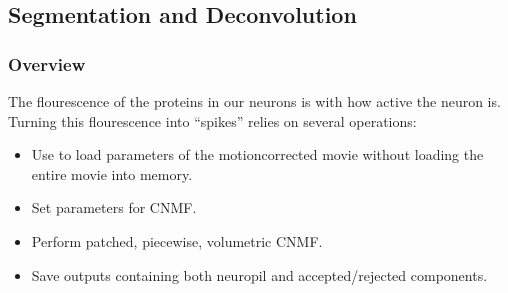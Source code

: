 \documentclass[letterpaper,10pt,english]{sphinxmanual}
\begin{document}
\begin{sphinxVerbatim}[commandchars=\\\{\}]
        
         
     
     
         
        
       
     
         
\end{sphinxVerbatim}

\sphinxstepscope


\subsection{Segmentation and Deconvolution}
\label{\detokenize{user_guide/segmentation:segmentation-and-deconvolution}}\label{\detokenize{user_guide/segmentation:segmentation-deconvolution}}\label{\detokenize{user_guide/segmentation::doc}}
\noindent{}


\subsubsection{Overview}
\label{\detokenize{user_guide/segmentation:overview}}
\sphinxAtStartPar
The flourescence of the proteins in our neurons is  with how active the neuron is.
Turning this flourescence into “spikes” relies on several operations:
\begin{itemize}
\item {} 
\sphinxAtStartPar
Use  to load parameters of the motion\sphinxhyphen{}corrected movie without loading the entire movie into memory.

\item {} 
\sphinxAtStartPar
Set parameters for CNMF.

\item {} 
\sphinxAtStartPar
Perform patched, piecewise, volumetric CNMF.

\item {} 
\sphinxAtStartPar
Save outputs containing both neuropil and accepted/rejected components.

\end{itemize}
\end{document}
